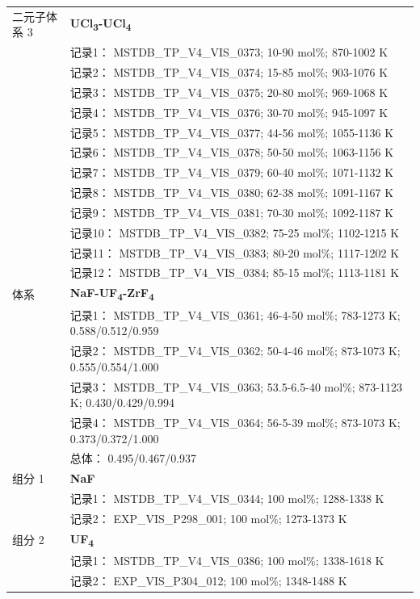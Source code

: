 \documentclass[12pt]{article}
\begin{document}
{\begin{longtable}[]{@{}
  >{\raggedright\arraybackslash}p{}
  >{\raggedright\arraybackslash}p{}@{}}
二元子体系 3  & \textbf{UCl\textsubscript{3}-UCl\textsubscript{4}} \\
 & 记录1： MSTDB\_TP\_V4\_VIS\_0373; 10-90 mol\%; 870-1002 K \\
 & 记录2： MSTDB\_TP\_V4\_VIS\_0374; 15-85 mol\%; 903-1076 K \\
 & 记录3： MSTDB\_TP\_V4\_VIS\_0375; 20-80 mol\%; 969-1068 K \\
 & 记录4： MSTDB\_TP\_V4\_VIS\_0376; 30-70 mol\%; 945-1097 K \\
 & 记录5： MSTDB\_TP\_V4\_VIS\_0377; 44-56 mol\%; 1055-1136 K \\
 & 记录6： MSTDB\_TP\_V4\_VIS\_0378; 50-50 mol\%; 1063-1156 K \\
 & 记录7： MSTDB\_TP\_V4\_VIS\_0379; 60-40 mol\%; 1071-1132 K \\
 & 记录8： MSTDB\_TP\_V4\_VIS\_0380; 62-38 mol\%; 1091-1167 K \\
 & 记录9： MSTDB\_TP\_V4\_VIS\_0381; 70-30 mol\%; 1092-1187 K \\
 & 记录10： MSTDB\_TP\_V4\_VIS\_0382; 75-25 mol\%; 1102-1215 K \\
 & 记录11： MSTDB\_TP\_V4\_VIS\_0383; 80-20 mol\%; 1117-1202 K \\
 & 记录12： MSTDB\_TP\_V4\_VIS\_0384; 85-15 mol\%; 1113-1181 K  \\

\midrule
体系 & \textbf{NaF-UF\textsubscript{4}-ZrF\textsubscript{4}} \\
 & 记录1： MSTDB\_TP\_V4\_VIS\_0361; 46-4-50 mol\%; 783-1273 K; 0.588/0.512/0.959 \\
 & 记录2： MSTDB\_TP\_V4\_VIS\_0362; 50-4-46 mol\%; 873-1073 K; 0.555/0.554/1.000 \\
 & 记录3： MSTDB\_TP\_V4\_VIS\_0363; 53.5-6.5-40 mol\%; 873-1123 K; 0.430/0.429/0.994 \\
 & 记录4： MSTDB\_TP\_V4\_VIS\_0364; 56-5-39 mol\%; 873-1073 K; 0.373/0.372/1.000 \\
 & 总体： 0.495/0.467/0.937  \\

组分 1  & \textbf{NaF} \\
 & 记录1： MSTDB\_TP\_V4\_VIS\_0344; 100 mol\%; 1288-1338 K \\
 & 记录2： EXP\_VIS\_P298\_001; 100 mol\%; 1273-1373 K  \\

组分 2  & \textbf{UF\textsubscript{4}} \\
 & 记录1： MSTDB\_TP\_V4\_VIS\_0386; 100 mol\%; 1338-1618 K \\
 & 记录2： EXP\_VIS\_P304\_012; 100 mol\%; 1348-1488 K  \\


\end{longtable}}
\end{document}
